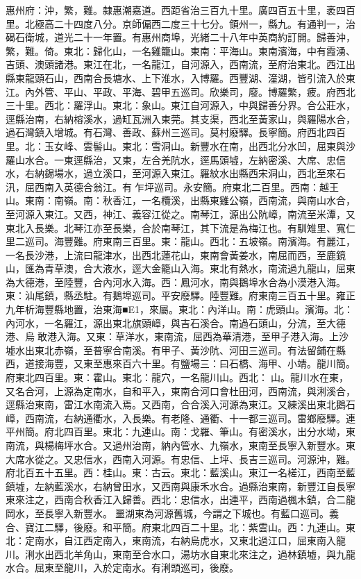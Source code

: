 \begin{pinyinscope}
惠州府：沖，繁，難。隸惠潮嘉道。西距省治三百九十里。廣四百五十里，袤四百里。北極高二十四度八分。京師偏西二度三十七分。領州一，縣九。有通判一，治碣石衛城，道光二十一年置。有惠州商埠，光緒二十八年中英商約訂開。歸善沖，繁，難。倚。東北：歸化山，一名雞籠山。東南：平海山。東南濱海，中有霞湧、吉頭、澳頭諸港。東江在北，一名龍江，自河源入，西南流，至府治東北。西江出縣東龍頭石山，西南合長塘水、上下淮水，入博羅。西豐湖、潼湖，皆引流入於東江。內外管、平山、平政、平海、碧甲五巡司。欣樂司，廢。博羅繁，疲。府西北三十里。西北：羅浮山。東北：象山。東江自河源入，中與歸善分界。合公莊水，逕縣治南，右納榕溪水，過缸瓦洲入東莞。其支渠，西北至黃家山，與羅陽水合，過石灣鎮入增城。有石灣、善政、蘇州三巡司。莫村廢驛。長寧簡。府西北四百里。北：玉女峰、雲髻山。東北：雪洞山。新豐水在南，出西北分水凹，屈東與沙羅山水合。一東逕縣治，又東，左合羌阬水，逕馬頭墟，左納密溪、大席、忠信水，右納錫場水，過立溪口，至河源入東江。羅紋水出縣西宋洞山，西北至來石汛，屈西南入英德合翁江。有乍坪巡司。永安簡。府東北二百里。西南：越王山。東南：南嶺。南：秋香江，一名欖溪，出縣東雞公嶺，西南流，與南山水合，至河源入東江。又西，神江、義容江從之。南琴江，源出公阬嶂，南流至米潭，又東北入長樂。北琴江亦至長樂，合於南琴江，其下流是為梅江也。有馴雉里、寬仁里二巡司。海豐難。府東南三百里。東：龍山。西北：五坡嶺。南濱海。有麗江，一名長沙港，上流曰龍津水，出西北蓮花山，東南會黃姜水，南屈而西，至鹿鏡山，匯為青草澳，合大液水，逕大金籠山入海。東北有熱水，南流過九龍山，屈東為大德港，至陸豐，合內河水入海。西：鳳河水，南與鵝埠水合為小漠港入海。東：汕尾鎮，縣丞駐。有鵝埠巡司。平安廢驛。陸豐難。府東南三百五十里。雍正九年析海豐縣地置，治東海■E1，來屬。東北：內洋山。南：虎頭山。濱海。北：內河水，一名羅江，源出東北旗頭嶂，與吉石溪合。南過石頭山，分流，至大德港、烏敢港入海。又東：草洋水，東南流，屈西為華清港，至甲子港入海。上沙墟水出東北赤嶺，至普寧合南溪。有甲子、黃沙阬、河田三巡司。有法留鋪在縣西，道接海豐，又東至惠來百六十里。有鹽場三：曰石橋、海甲、小靖。龍川簡。府東北四百里。東：霍山。東北：龍穴，一名龍川山。西北：山。龍川水在東，又名合河，上源為定南水，自和平入，東南合河口會杜田河，西南流，與浰溪合，逕縣治東南，雷江水南流入焉。又西南，合合溪入河源為東江。又練溪出東北鵝石嶂，西南流，右納通衢水，入長樂。有老隆、通衢、十一都三巡司。雷鄉廢驛。連平州簡。府北四百里。東北：九連山。南：戈羅、筆山。有密溪水，出分水坳，東南流，與楊梅坪水合。又過州治南，納內管水、九嶺水，東南至長寧入新豐水。東大席水從之。又忠信水，西南入河源。有忠信、上坪、長吉三巡司。河源沖，難。府北百五十五里。西：桂山。東：古云。東北：藍溪山。東江一名槎江，西南至藍鎮墟，左納藍溪水，右納曾田水，又西南與康禾水合。過縣治東南，新豐江自長寧東來注之，西南合秋香江入歸善。西北：忠信水，出連平，西南過楓木鎮，合二龍岡水，至長寧入新豐水。噩湖東為河源舊城，今謂之下城也。有藍口巡司。義合、寶江二驛，後廢。和平簡。府東北四百二十里。北：紫雲山。西：九連山。東北：定南水，自江西定南入，東南流，右納烏虎水，又東北過江口，屈東南入龍川。浰水出西北羊角山，東南至合水口，湯坊水自東北來注之，過林鎮墟，與九龍水合。屈東至龍川，入於定南水。有浰頭巡司，後廢。


\end{pinyinscope}
